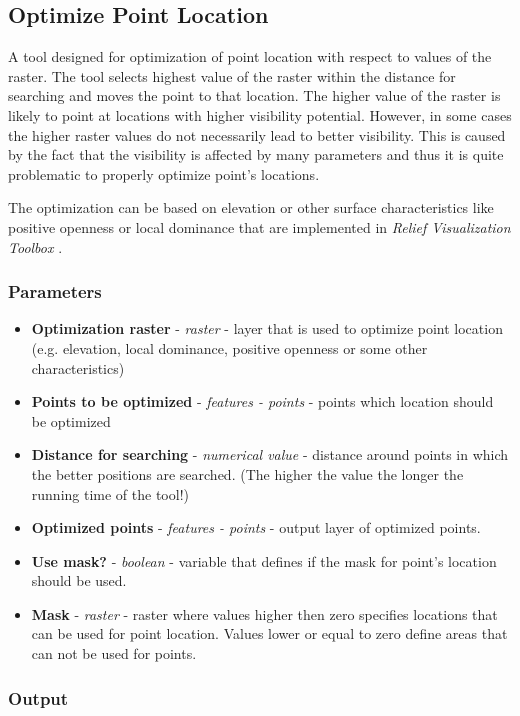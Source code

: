 \documentclass[]{article}
\begin{document}
\subsection{Optimize Point Location}

A tool designed for optimization of point location with respect to values of the raster. The tool selects highest value of the raster within the distance for searching and moves the point to that location. The higher value of the raster is likely to point at locations with higher visibility potential. However, in some cases the higher raster values do not necessarily lead to better visibility. This is caused by the fact that the visibility is affected by many parameters and thus it is quite problematic to properly optimize point's locations.

The optimization can be based on elevation or other surface characteristics like positive openness or local dominance that are implemented in \textit{Relief Visualization Toolbox} \citep{Kokalj2016}.

\subsubsection{Parameters}
\begin{itemize}
	\item \textbf{Optimization raster} - \textit{raster} - layer that is used to optimize point location (e.g. elevation, local dominance, positive openness or some other characteristics)
	\item \textbf{Points to be optimized} - \textit{features - points} - points which location should be optimized
	\item \textbf{Distance for searching} - \textit{numerical value} - distance around points in which the better positions are searched. (The higher the value the longer the running time of the tool!)
	\item \textbf{Optimized points} - \textit{features - points} - output layer of optimized points.
	\item \textbf{Use mask?} - \textit{boolean} - variable that defines if the mask for point's location should be used.
	\item \textbf{Mask} - \textit{raster} - raster where values higher then zero specifies locations that can be used for point location. Values lower or equal to zero define areas that can not be used for points.
\end{itemize}

\subsubsection{Output}
\end{document}
